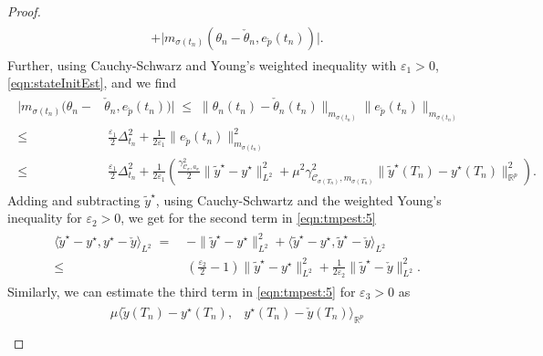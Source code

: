 \documentclass[reqno]{amsart}
\newcommand{\R}{\mathbb R}
\newcommand{\state}{\theta}
\newcommand{\adState}{p}
\newcommand{\outVar}{y}
\newcommand{\outVarDim}{p}
\newcommand{\cOper}{\calC}
\newcommand{\initBound}{\initBoundn{n}}%
\newcommand{\initBoundn}[1]{\Delta_{t_{#1}}}
\newcommand{\intermediateInitState}{\intermediateState_n}%
\newcommand{\optOutVar}{\outVar^\star}
\newcommand{\switch}{\sigma}
\newcommand{\reduce}[1]{\tilde{#1}}
\newcommand{\outVarRed}{\reduce{\outVar}}
\newcommand{\optOutVarRed}{\outVarRed^\star}
\newcommand{\intermediateState}{\check{\state}}
\newcommand{\intermediateAdStateB}{\check{\adState}}
\newcommand{\intermediateOutVar}{\check{\outVar}}
\newcommand{\calC}{\mathcal{C}}
\begin{document}
\begin{proof}
\begin{align}
\begin{aligned}
        +\big| m_{\switch(t_n)}(\state_{n} - \intermediateInitState, e_{\intermediateAdStateB}(t_n)) \big|.
        \end{aligned}
	\end{align}
    Further, using Cauchy-Schwarz and Young's weighted inequality with $\varepsilon_1>0$, \eqref{eqn:stateInitEst}, and  we find
    \begin{align}  
    \label{eqn:tempest:4}
    \begin{aligned}
        \big|m_{\switch(t_n)}(\state_{n} -& \intermediateInitState, e_{\intermediateAdStateB}(t_n))\big|\; \leq \; \| \state_{n}(t_n) - \intermediateInitState(t_n)\|_{m_{\switch(t_n)}} \|e_{\intermediateAdStateB}(t_n) \|_{m_{\switch(t_n)}}\\
        \leq& \; \tfrac{\varepsilon_1}{2}\initBound^2 + \tfrac{1}{2\varepsilon_1}\|e_{\intermediateAdStateB}(t_n) \|_{m_{\switch(t_n)}}^2\\
        \leq &\; \tfrac{\varepsilon_1}{2}\initBound^2 + \tfrac{1}{2\varepsilon_1}\left({\tfrac{\gamma^2_{\cOper_{\switch},{a}_{\switch}}}{2}}\|\optOutVarRed - \optOutVar\|^2_{L^2}
    +{\mu^2 \gamma^2_{\cOper_{\sigma(T_n)},m_{\switch(T_n)}}} \| \optOutVarRed(T_n) - \optOutVar(T_n)\|^2_{\R^{\outVarDim}}\right) .
    \end{aligned}
    \end{align}
	Adding and subtracting $\optOutVarRed$, using Cauchy-Schwartz and the weighted Young's inequality for $\varepsilon_2>0$, we get for the second term in \eqref{eqn:tmpest:5}
	\begin{align}
		\label{eqn:tmpest:2}
		\begin{aligned}
		 \langle \optOutVarRed - \optOutVar, \optOutVar-\intermediateOutVar\rangle_{L^2}
		\;=&\;-\|\optOutVarRed - \optOutVar\|_{L^2}^2 + \langle \optOutVarRed-\optOutVar, \optOutVarRed - \intermediateOutVar\rangle_{L^2}\\
		\leq&\; \left(\tfrac{\varepsilon_2}{2}-1\right)\|\optOutVarRed - \optOutVar\|_{L^2}^2 + \tfrac{1}{2\varepsilon_2}\|\optOutVarRed - \intermediateOutVar\|_{L^2}^2.
		\end{aligned}
	\end{align}
	Similarly, we can estimate the third term in \eqref{eqn:tmpest:5} for $\varepsilon_3>0$ as
	\begin{align}
		\label{eqn:tmpest:3}
  \begin{aligned}
		\mu \langle \outVarRed(T_n) - \optOutVar(T_n),& \optOutVar(T_n) -\intermediateOutVar(T_n)\rangle_{\R^{\outVarDim}} \\

\end{aligned}
\end{align}
\end{proof}
\end{document}
